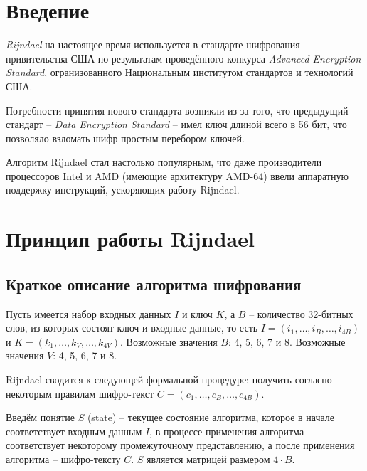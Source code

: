 \section{Введение}

    \textit{Rijndael} на настоящее время используется в стандарте шифрования привительства США по
    результатам проведённого конкурса \textit{Advanced Encryption Standard}, огранизованного
    Национальным институтом стандартов и технологий США.

    Потребности принятия нового стандарта возникли из-за того, что предыдущий стандарт --
    \textit{Data Encryption Standard} -- имел ключ длиной всего в 56 бит, что позволяло взломать
    шифр простым перебором ключей.

    Алгоритм Rijndael стал настолько популярным, что даже производители процессоров Intel и AMD
    (имеющие архитектуру AMD-64)
    ввели аппаратную поддержку инструкций, ускоряющих работу Rijndael.

\section{Принцип работы Rijndael}
\subsection{Краткое описание алгоритма шифрования}

    Пусть имеется набор входных данных $I$ и ключ $K$, а $B$ -- количество 32-битных слов, из которых
    состоят ключ и входные данные, то есть $I = (i_1, \dots, i_{B}, \dots, i_{4B})$ и
    $K = (k_1, \dots, k_{V}, \dots, k_{4V})$.
    Возможные значения $B$: 4, 5, 6, 7 и 8. Возможные значения $V$: 4, 5, 6, 7 и 8.

    Rijndael сводится к следующей формальной процедуре: получить согласно некоторым правилам
    шифро-текст $C = (c_1, \dots, c_{B}, \dots, c_{4B})$.

    Введём понятие $S$ (state) -- текущее состояние алгоритма, которое в начале соответствует входным данным $I$,
    в процессе применения алгоритма соответствует некоторому промежуточному представлению,
    а после применения алгоритма -- шифро-тексту $C$. $S$ является матрицей размером $4 \cdot B$.


